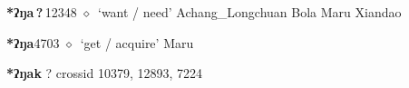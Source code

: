   \begin{list}{}{\leftmargin=1.5em \itemindent=-1.5em}
  \item {\footnotesize \textbf{*ʔŋa\,?\,}}{\tiny 12348}
         $\diamond$~`want / need'
         Achang\_Longchuan 
\hspace{1ex}
         Bola 
\hspace{1ex}
         Maru 
\hspace{1ex}
         Xiandao 
  \item {\footnotesize \textbf{*ʔŋa}}{\tiny 4703}
\hspace{1ex}
         $\diamond$~`get / acquire'
         Maru 
  \end{list}
\item
\textbf{*ʔŋak}
?
  {\tiny crossid 10379, 12893, 7224}
